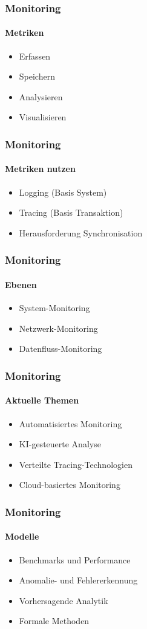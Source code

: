 \begin{frame}
  \frametitle{Monitoring}
  \framesubtitle{Metriken }
  \begin{itemize}
    \item Erfassen
    \item Speichern
    \item Analysieren
    \item Visualisieren
  \end{itemize}
\end{frame}

\begin{frame}
  \frametitle{Monitoring}
  \framesubtitle{Metriken nutzen}
  \begin{itemize}
    \item Logging (Basis System)
    \item Tracing (Basis Transaktion)
    \item Herausforderung Synchronisation
  \end{itemize}
\end{frame}

\begin{frame}
  \frametitle{Monitoring}
  \framesubtitle{Ebenen}
  \begin{itemize}
    \item System-Monitoring
    \item Netzwerk-Monitoring
    \item Datenfluss-Monitoring
  \end{itemize}
\end{frame}

\begin{frame}
  \frametitle{Monitoring}
  \framesubtitle{Aktuelle Themen}
  \begin{itemize}
    \item Automatisiertes Monitoring
    \item KI-gesteuerte Analyse
    \item Verteilte Tracing-Technologien
    \item Cloud-basiertes Monitoring
  \end{itemize}
\end{frame}

\begin{frame}
  \frametitle{Monitoring}
  \framesubtitle{Modelle}
  \begin{itemize}
    \item Benchmarks und Performance
    \item Anomalie- und Fehlererkennung
    \item Vorhersagende Analytik
    \item Formale Methoden
  \end{itemize}
\end{frame}

